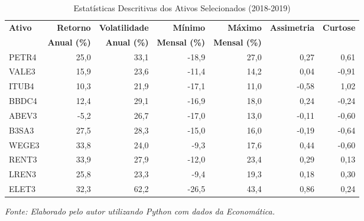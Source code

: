 \begin{table}[H]
\centering
\caption{Estatísticas Descritivas dos Ativos Selecionados (2018-2019)}
\begin{tabular}{|l|r|r|r|r|r|r|}
\hline
\textbf{Ativo} & \textbf{Retorno} & \textbf{Volatilidade} & \textbf{Mínimo} & \textbf{Máximo} & \textbf{Assimetria} & \textbf{Curtose} \\
& \textbf{Anual (\%)} & \textbf{Anual (\%)} & \textbf{Mensal (\%)} & \textbf{Mensal (\%)} & & \\
\hline
PETR4 & 25,0 & 33,1 & -18,9 & 27,0 & 0,27 & 0,61 \\
\hline
VALE3 & 15,9 & 23,6 & -11,4 & 14,2 & 0,04 & -0,91 \\
\hline
ITUB4 & 10,3 & 21,9 & -17,1 & 11,0 & -0,58 & 1,02 \\
\hline
BBDC4 & 12,4 & 29,1 & -16,9 & 18,0 & 0,24 & -0,24 \\
\hline
ABEV3 & -5,2 & 26,7 & -17,0 & 13,0 & -0,11 & -0,60 \\
\hline
B3SA3 & 27,5 & 28,3 & -15,0 & 16,0 & -0,19 & -0,64 \\
\hline
WEGE3 & 33,8 & 24,0 & -9,3 & 17,6 & 0,44 & -0,60 \\
\hline
RENT3 & 33,9 & 27,9 & -12,0 & 23,4 & 0,29 & 0,13 \\
\hline
LREN3 & 25,8 & 23,3 & -9,4 & 19,3 & 0,18 & 0,30 \\
\hline
ELET3 & 32,3 & 62,2 & -26,5 & 43,4 & 0,86 & 0,24 \\
\hline
\end{tabular}

\textit{Fonte: Elaborado pelo autor utilizando Python com dados da Economática.}
\label{tab:descriptive_stats}
\end{table}

